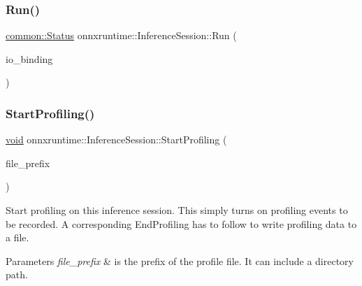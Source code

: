 \mbox{\label{classonnxruntime_1_1InferenceSession_a368fe68929fde82474199bfe581e24ce}} 
\subsubsection{\texorpdfstring{Run()}{Run()}\hspace{0.1cm}{\footnotesize\ttfamily [4/4]}}
{\footnotesize\ttfamily \mbox{\hyperlink{classonnxruntime_1_1common_1_1Status}{common\+::\+Status}} onnxruntime\+::\+Inference\+Session\+::\+Run (\begin{DoxyParamCaption}\item[{\mbox{\hyperlink{classonnxruntime_1_1IOBinding}{I\+O\+Binding}} \&}]{io\+\_\+binding }\end{DoxyParamCaption})}

\mbox{\label{classonnxruntime_1_1InferenceSession_ab29bd2f63b9f4d5840e846f8bf705e8a}} 
\subsubsection{\texorpdfstring{Start\+Profiling()}{StartProfiling()}\hspace{0.1cm}{\footnotesize\ttfamily [1/2]}}
{\footnotesize\ttfamily \mbox{\hyperlink{mlasi_8h_a88f941d423cb2a819b70a1358982b1a6}{void}} onnxruntime\+::\+Inference\+Session\+::\+Start\+Profiling (\begin{DoxyParamCaption}\item[{const std\+::string \&}]{file\+\_\+prefix }\end{DoxyParamCaption})}

Start profiling on this inference session. This simply turns on profiling events to be recorded. A corresponding End\+Profiling has to follow to write profiling data to a file. 
\begin{DoxyParams}{Parameters}
{\em file\+\_\+prefix} & is the prefix of the profile file. It can include a directory path. \\
\hline
\end{DoxyParams}
\mbox{\label{classonnxruntime_1_1InferenceSession_a7d688c79939567a953aa7f1b3559c7b7}} 
